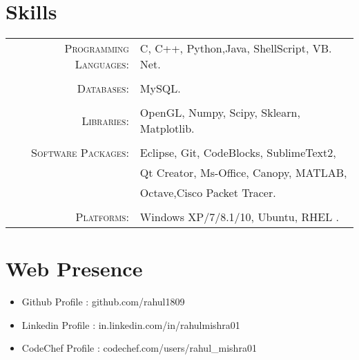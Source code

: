 \documentclass[a4paper,10pt]{article}
\begin{document}
\section{Skills }
\begin{tabular}{rl}
 \textsc{Programming Languages:}& C, C++, Python,Java, ShellScript, VB. Net.
 \\ &\\
  \textsc{Databases:}&  MySQL.
 \\ &\\
  \textsc{Libraries:}&  OpenGL, Numpy, Scipy, Sklearn, Matplotlib.
 \\ &\\
\textsc{Software Packages:}& Eclipse, Git, CodeBlocks, SublimeText2,\\ & Qt Creator, Ms-Office, Canopy, MATLAB, \\ & Octave,Cisco Packet Tracer.\\&\\ 
\textsc{Platforms:}& Windows XP/7/8.1/10, Ubuntu, RHEL .\\
\end{tabular}

\section{Web Presence }
\begin{itemize}
  \item Github Profile : github.com/rahul1809
  \item Linkedin Profile : in.linkedin.com/in/rahulmishra01
  \item CodeChef Profile : codechef.com/users/rahul\_mishra01
\end{itemize}
\end{document}
